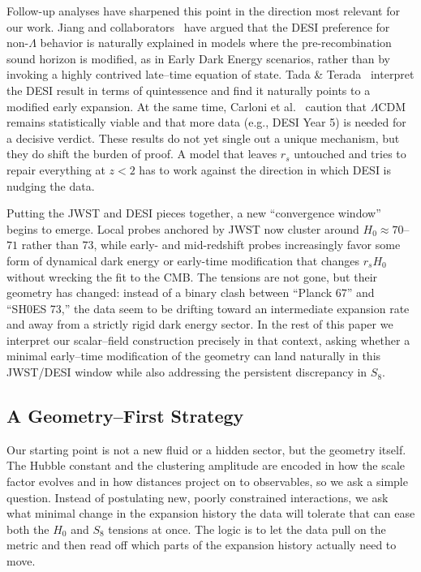 \documentclass[a4paper,11pt]{article}
\begin{document}
Follow-up analyses have sharpened this point in the direction most relevant for our work. Jiang and collaborators~\cite{Jiang_DESI_EDE} have argued that the DESI preference for non-$\Lambda$ behavior is naturally explained in models where the pre-recombination sound horizon is modified, as in Early Dark Energy scenarios, rather than by invoking a highly contrived late--time equation of state. Tada \& Terada~\cite{Tada_Terada} interpret the DESI result in terms of quintessence and find it naturally points to a modified early expansion. At the same time, Carloni et al.~\cite{Carloni_DESI} caution that $\Lambda$CDM remains statistically viable and that more data (e.g., DESI Year 5) is needed for a decisive verdict. These results do not yet single out a unique mechanism, but they do shift the burden of proof. A model that leaves $r_s$ untouched and tries to repair everything at $z < 2$ has to work against the direction in which DESI is nudging the data.

Putting the JWST and DESI pieces together, a new ``convergence window'' begins to emerge. Local probes anchored by JWST now cluster around $H_0 \approx 70$--$71$ rather than 73, while early- and mid-redshift probes increasingly favor some form of dynamical dark energy or early-time modification that changes $r_s H_0$ without wrecking the fit to the CMB. The tensions are not gone, but their geometry has changed: instead of a binary clash between ``Planck 67'' and ``SH0ES 73,'' the data seem to be drifting toward an intermediate expansion rate and away from a strictly rigid dark energy sector. In the rest of this paper we interpret our scalar--field construction precisely in that context, asking whether a minimal early--time modification of the geometry can land naturally in this JWST/DESI window while also addressing the persistent discrepancy in $S_8$.

\subsection{A Geometry--First Strategy}

Our starting point is not a new fluid or a hidden sector, but the geometry itself. The Hubble constant and the clustering amplitude are encoded in how the scale factor evolves and in how distances project on to observables, so we ask a simple question. Instead of postulating new, poorly constrained interactions, we ask what minimal change in the expansion history the data will tolerate that can ease both the $H_0$ and $S_8$ tensions at once. The logic is to let the data pull on the metric and then read off which parts of the expansion history actually need to move.
\end{document}
